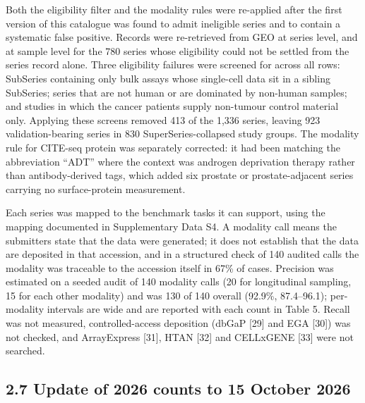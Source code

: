 \documentclass[11pt]{article}
\begin{document}
Both the eligibility filter and the modality rules were re-applied after
the first version of this catalogue was found to admit ineligible series
and to contain a systematic false positive. Records were re-retrieved
from GEO at series level, and at sample level for the 780 series whose
eligibility could not be settled from the series record alone. Three
eligibility failures were screened for across all rows: SubSeries
containing only bulk assays whose single-cell data sit in a sibling
SubSeries; series that are not human or are dominated by non-human
samples; and studies in which the cancer patients supply non-tumour
control material only. Applying these screens removed 413 of the 1,336
series, leaving 923 validation-bearing series in 830
SuperSeries-collapsed study groups. The modality rule for CITE-seq
protein was separately corrected: it had been matching the abbreviation
``ADT'' where the context was androgen deprivation therapy rather than
antibody-derived tags, which added six prostate or prostate-adjacent
series carrying no surface-protein measurement.

Each series was mapped to the benchmark tasks it can support, using the
mapping documented in Supplementary Data S4. A modality call means the
submitters state that the data were generated; it does not establish
that the data are deposited in that accession, and in a structured check
of 140 audited calls the modality was traceable to the accession itself
in 67\% of cases. Precision was estimated on a seeded audit of 140
modality calls (20 for longitudinal sampling, 15 for each other
modality) and was 130 of 140 overall (92.9\%, 87.4--96.1); per-modality
intervals are wide and are reported with each count in Table 5. Recall
was not measured, controlled-access deposition (dbGaP {[}29{]} and EGA
{[}30{]}) was not checked, and ArrayExpress {[}31{]}, HTAN {[}32{]} and
CELLxGENE {[}33{]} were not searched.

\subsection{2.7 Update of 2026 counts to 15 October 2026}\label{update-of-2026-counts-to-15-october-2026}
\end{document}
